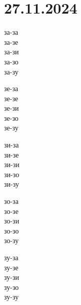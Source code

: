 \documentclass[a5paper,12pt]{article}
\begin{document}
\section{27.11.2024}
\noindent 
\begin{minipage}[t]{0.19\textwidth}
  за-за\\
  за-зе\\
  за-зи\\
  за-зо\\
  за-зу
\end{minipage}
\hfill 
\begin{minipage}[t]{0.19\textwidth}
  зе-за\\
  зе-зе\\
  зе-зи\\
  зе-зо\\
  зе-зу
\end{minipage}
\hfill %
\begin{minipage}[t]{0.19\textwidth}
  зи-за\\
  зи-зе\\
  зи-зи\\
  зи-зо\\
  зи-зу
\end{minipage}
\hfill %
\begin{minipage}[t]{0.19\textwidth}
  зо-за\\
  зо-зе\\
  зо-зи\\
  зо-зо\\
  зо-зу
\end{minipage}
\hfill %
\begin{minipage}[t]{0.19\textwidth}
  зу-за\\
  зу-зе\\
  зу-зи\\
  зу-зо\\
  зу-зу
\end{minipage}

\vspace{1cm}
\end{document}
